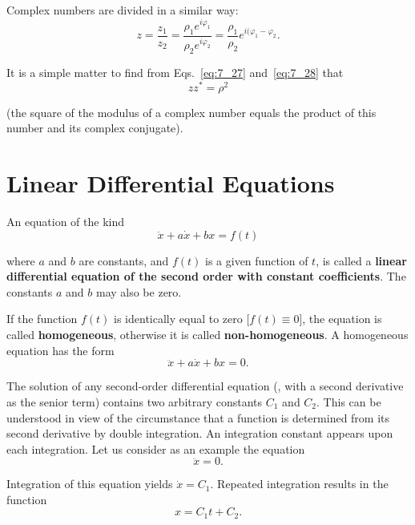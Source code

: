 \noindent
Complex numbers are divided in a similar way:
\begin{equation}\label{eq:7_32}
	z = \frac{z_1}{z_2} = \frac{\rho_1 e^{i\varphi_1}}{\rho_2 e^{i\varphi_2}} = \frac{\rho_1}{\rho_2}e^{i(\varphi_1 - \varphi_2}.
\end{equation}

It is a simple matter to find from Eqs.~\eqref{eq:7_27} and~\eqref{eq:7_28} that
\begin{equation}\label{eq:7_33}
	zz^* = \rho^2
\end{equation}

\noindent
(the square of the modulus of a complex number equals the product of this number and its complex conjugate).

\section{Linear Differential Equations}\label{sec:7_4}

An equation of the kind
\begin{equation}\label{eq:7_34}
	\ddot{x} + a\dot{x} + bx = f(t)
\end{equation}

\noindent
where $a$ and $b$ are constants, and $f(t)$ is a given function of $t$, is called a \textbf{linear differential equation of the second order with constant coefficients}. The constants $a$ and $b$ may also be zero.

If the function $f(t)$ is identically equal to zero [$f(t)\equiv 0$], the equation is called \textbf{homogeneous}, otherwise it is called \textbf{non-homogeneous}. A homogeneous equation has the form
\begin{equation}\label{eq:7_35}
	\ddot{x} + a\dot{x} + bx = 0.
\end{equation}

The solution of any second-order differential equation (\ie, with a second derivative as the senior term) contains two arbitrary constants $C_1$ and $C_2$. This can be understood in view of the circumstance that a function is determined from its second derivative by double integration. An integration constant appears upon each integration. Let us consider as an example the equation
\begin{equation}\label{eq:7_36}
	\ddot{x} = 0.
\end{equation}

\noindent
Integration of this equation yields $\dot{x}=C_1$. Repeated integration results in the function
\begin{equation}\label{eq:7_37}
	x = C_1 t + C_2.
\end{equation}

